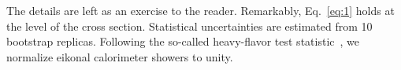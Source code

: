 The details are left as an exercise to the reader. Remarkably,
Eq.~\eqref{eq:1} holds at the level of the cross section. Statistical
uncertainties are estimated from 10 bootstrap replicas. Following the
so-called heavy-flavor test
statistic~\cite{TPC:0556-A-Four-Loop-Study-of-Lund-Plane-Emissions-in-the-Large-N-c-Limit-September-28-2026},
we normalize eikonal calorimeter showers to unity.

